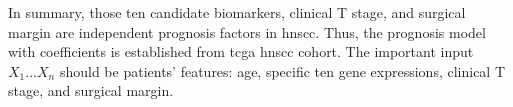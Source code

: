 \documentclass[jpm,article,submit,moreauthors,pdftex]{Definitions/mdpi}
\begin{document}
In summary, those ten candidate biomarkers, clinical T stage, and surgical margin are independent prognosis factors in \acrshort{hnscc}.
Thus, the prognosis model with coefficients is established from \acrshort{tcga} \acrshort{hnscc} cohort. The important input $X_1...X_n$ should be patients' features: age, specific ten gene expressions, clinical T stage, and surgical margin.
\end{document}
